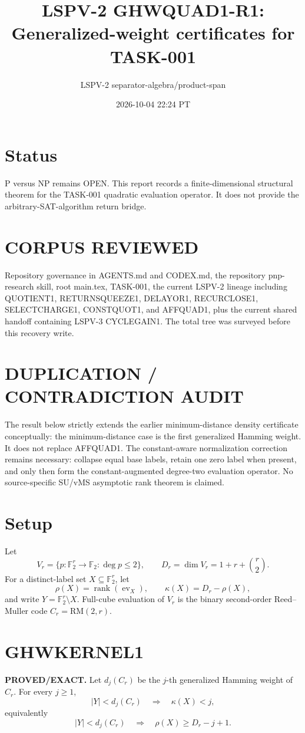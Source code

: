 \documentclass[11pt]{article}
\title{LSPV-2 GHWQUAD1-R1: Generalized-weight certificates for TASK-001}
\author{LSPV-2 separator-algebra/product-span}
\date{2026-10-04 22:24 PT}
\begin{document}
\maketitle

\section*{Status}
P versus NP remains OPEN.  This report records a finite-dimensional structural theorem for the TASK-001 quadratic evaluation operator.  It does not provide the arbitrary-SAT-algorithm return bridge.

\section*{CORPUS REVIEWED}
Repository governance in AGENTS.md and CODEX.md, the repository pnp-research skill, root main.tex, TASK-001, the current LSPV-2 lineage including QUOTIENT1, RETURNSQUEEZE1, DELAYOR1, RECURCLOSE1, SELECTCHARGE1, CONSTQUOT1, and AFFQUAD1, plus the current shared handoff containing LSPV-3 CYCLEGAIN1.  The total tree was surveyed before this recovery write.

\section*{DUPLICATION / CONTRADICTION AUDIT}
The result below strictly extends the earlier minimum-distance density certificate conceptually: the minimum-distance case is the first generalized Hamming weight.  It does not replace AFFQUAD1.  The constant-aware normalization correction remains necessary: collapse equal base labels, retain one zero label when present, and only then form the constant-augmented degree-two evaluation operator.  No source-specific SU/vMS asymptotic rank theorem is claimed.

\section*{Setup}
Let
\[
 V_r=\{p:\mathbb F_2^r\to\mathbb F_2:\deg p\le 2\},
 \qquad
 D_r=\dim V_r=1+r+\binom r2 .
\]
For a distinct-label set \(X\subseteq\mathbb F_2^r\), let
\[
 \rho(X)=\operatorname{rank}(\operatorname{ev}_X),\qquad
 \kappa(X)=D_r-\rho(X),
\]
and write \(Y=\mathbb F_2^r\setminus X\).  Full-cube evaluation of \(V_r\) is the binary second-order Reed--Muller code \(C_r=\mathrm{RM}(2,r)\).

\section*{GHWKERNEL1}
\textbf{PROVED/EXACT.}
Let \(d_j(C_r)\) be the \(j\)-th generalized Hamming weight of \(C_r\).  For every \(j\ge 1\),
\[
 |Y|<d_j(C_r)\quad\Longrightarrow\quad
 \kappa(X)<j,
\]
equivalently
\[
 |Y|<d_j(C_r)\quad\Longrightarrow\quad
 \rho(X)\ge D_r-j+1.
\]
\end{document}
